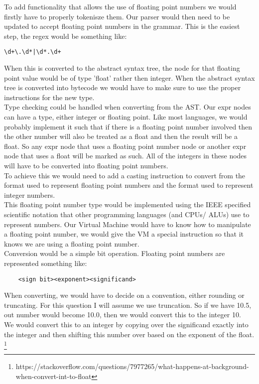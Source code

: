 \documentclass[11pt]{article}
\begin{document}
To add functionality that allows the use of floating point numbers we would
firstly have to properly tokenisze them.  Our parser would then need to be
updated to accept floating point numbers in the grammar.  This is the easiest
step, the regex would be something like:\\
\begin{lstlisting}
\d+\.\d*|\d*.\d+
\end{lstlisting}

When this is converted to the abstract syntax tree, the node for that floating
point value would be of type 'float' rather then integer.  When the abstract
syntax tree is converted into bytecode we would have to make sure to use the
proper instructions for the new type.\\

Type checking could be handled when converting from the AST.  Our expr nodes
can have a type, either integer or floating point.  Like most languages, we
would probably implement it such that if there is a floating point number
involved then the other number will also be treated as a float and then the
result will be a float.  So any expr node that uses a floating point number
node or another expr node that uses a float will be marked as such.  All of the
integers in these nodes will have to be converted into floating point
numbers.\\


To achieve this we would need to add a casting instruction to convert from the
format used to represent floating point numbers and the format used to
represent integer numbers.\\

This floating point number type would be implemented using the IEEE specified
scientific notation that other programming languages (and CPUs/ ALUs) use to
represent numbers. Our Virtual Machine would have to know how to manipulate a
floating point number, we would give the VM a special instruction so that it
knows we are using a floating point number.\\

Conversion would be a simple bit operation.  Floating point numbers are
represented something like:\\
\begin{lstlisting}
    <sign bit><exponent><significand>
\end{lstlisting}


When converting, we would have to decide on a convention, either rounding or
truncating.  For this question I will assume we use truncation.  So if we have
10.5, out number would become 10.0, then we would convert this to the integer
10.\\
We would convert this to an integer by copying over the significand exactly
into the integer and then shifting this number over based on the exponent of
the float. \footnote{https://stackoverflow.com/questions/7977265/what-happens-at-background-when-convert-int-to-float}
\end{document}
